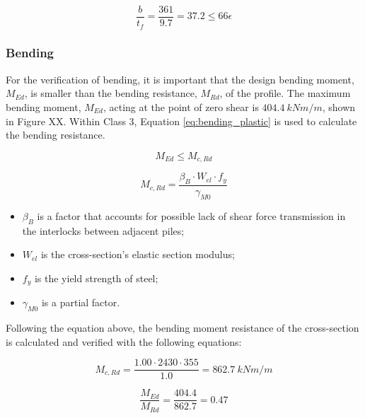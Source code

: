 \begin{equation}
    \frac{b}{t_{f}} = \frac{361}{9.7} = 37.2 \leq 66 \epsilon 
    \label{eq:class}
\end{equation}

\subsubsection{Bending}

For the verification of bending, it is important that the design bending moment, $M_{Ed}$, is smaller than the bending resistance, $M_{Rd}$, of the profile. The maximum bending moment, $M_{Ed}$, acting at the point of zero shear is $404.4 \ kNm/m$, shown in Figure XX. Within Class 3, Equation \ref{eq:bending_plastic} is used to calculate the bending resistance.

\begin{equation}
    M_{Ed} \leq M_{c,Rd}
\end{equation}

\begin{equation}
    M_{c,Rd} = \frac{\beta_{B} \cdot W_{el} \cdot f_{y}}{\gamma_{M0}}
    \label{eq:bending_plastic}
\end{equation}

\begin{itemize}
  \item $\beta_B$ is a factor that accounts for possible lack of shear force transmission in the interlocks between adjacent piles;
  \item $W_{el}$ is the cross-section’s elastic section modulus;
  \item $f_y$ is the yield strength of steel;
  \item $\gamma_{M0}$ is a partial factor.
\end{itemize}

Following the equation above, the bending moment resistance of the cross-section is calculated and verified with the following equations:

\begin{equation}
    M_{c,Rd} = \frac{1.00 \cdot 2430 \cdot 355}{1.0} = 862.7 \ kNm/m
\end{equation}

\begin{equation}
    \frac{M_{Ed}}{M_{Rd}} = \frac{404.4}{862.7} = 0.47
\end{equation}


